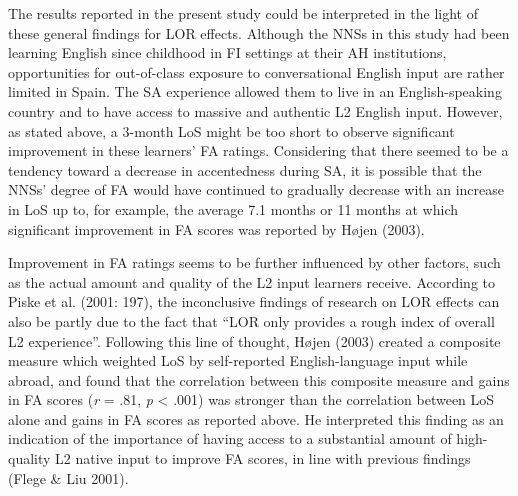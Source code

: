 \documentclass[12pt]{article}
\newenvironment{styleStandard}{\setlength\leftskip{0cm}\setlength\rightskip{0cm plus 1fil}\setlength\parindent{0cm}\setlength\parfillskip{0pt plus 1fil}\setlength\parskip{0in plus 1pt}\writerlistparindent\writerlistleftskip\leavevmode\normalfont\normalsize\writerlistlabel\ignorespaces}{\unskip\vspace{0.111in plus 0.0111in}\par}
\newcommand\writerlistleftskip{}
\newcommand\writerlistparindent{}
\newcommand\writerlistlabel{}
\begin{document}
\begin{styleStandard}
The results reported in the present study could be interpreted in the light of these general findings for LOR effects. Although the NNSs in this study had been learning English since childhood in FI settings at their AH institutions, opportunities for out-of-class exposure to conversational English input are rather limited in Spain. The SA experience allowed them to live in an English-speaking country and to have access to massive and authentic L2 English input. However, as stated above, a 3-month LoS might be too short to observe significant improvement in these learners’ FA ratings. Considering that there seemed to be a tendency toward a decrease in accentedness during SA, it is possible that the NNSs’ degree of FA would have continued to gradually decrease with an increase in LoS up to, for example, the average 7.1 months or 11 months at which significant improvement in FA scores was reported by Højen (2003).
\end{styleStandard}

\begin{styleStandard}
Improvement in FA ratings seems to be further influenced by other factors, such as the actual amount and quality of the L2 input learners receive. According to Piske et al. (2001: 197), the inconclusive findings of research on LOR effects can also be partly due to the fact that “LOR only provides a rough index of overall L2 experience”. Following this line of thought, Højen (2003) created a composite measure which weighted LoS by self-reported English-language input while abroad, and found that the correlation between this composite measure and gains in FA scores (\textit{r} = .81, \textit{p} {\textless} .001) was stronger than the correlation between LoS alone and gains in FA scores as reported above. He interpreted this finding as an indication of the importance of having access to a substantial amount of high-quality L2 native input to improve FA scores, in line with previous findings (Flege \& Liu 2001).
\end{styleStandard}
\end{document}
